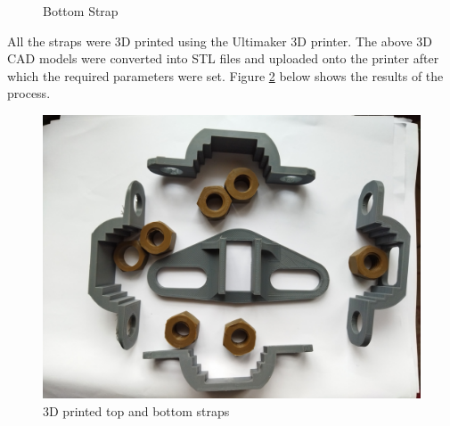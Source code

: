 \begin{itemize}
\begin{figure}[H]
        \caption{Bottom Strap}
        \label{fig: Bottom Strap}
        \end{figure}
All the straps were 3D printed using the Ultimaker 3D printer. The above 3D CAD models were converted into STL files and uploaded onto the printer after which the required parameters were set. Figure \ref{fig: 3D printed top and bottom straps} below shows the results of the process.
\begin{figure}[H]
        \centering
        \includegraphics [width=.8\textwidth] {Figures/IMG_20220930_073222.jpg}
        \caption{3D printed top and bottom straps}
        \label{fig: 3D printed top and bottom straps}
        \end{figure}


\end{itemize}
